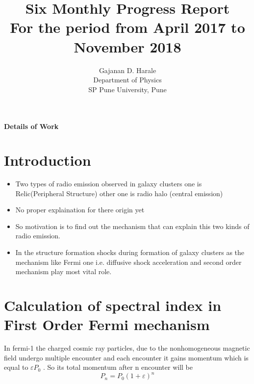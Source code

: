 \documentclass[10pt]{article}
\begin{document}



\title{\vspace{-30mm}\fontsize{18pt}{10pt}\selectfont\textbf{Six Monthly Progress Report\\ For the period from April 2017 to November 2018  }}
\author{Gajanan D. Harale\\ Department of Physics \\ SP Pune University, Pune}


 \maketitle


\fontsize{18pt}{12pt}\selectfont\textbf{Details of Work}




\section[]{Introduction}
\begin{itemize}
\item Two types of radio emission observed in galaxy clusters one is Relic(Peripheral Structure) other one is radio halo (central emission)
\item No proper explaination for there origin yet
\item So motivation is to find out the mechanism that can explain this two kinds of radio emission.
\item In the structure formation shocks during formation of galaxy clusters as the mechanism like Fermi one i.e. diffusive shock acceleration and second order mechanism play most vital role.
\end{itemize}
  
\section[]{Calculation of spectral index in First Order Fermi mechanism}
In fermi-1 the charged cosmic ray particles, due to the nonhomogeneous magnetic field undergo multiple encounter and each encounter it gains momentum which is equal to 
$\varepsilon P_{0}$ . So its total momentum after n encounter will be
\begin{equation}
 P_{n}= P_{0}\left( 1 + \varepsilon\right)^{n}
 \label{eq:Pn}
 \end{equation}
 
\end{document}
